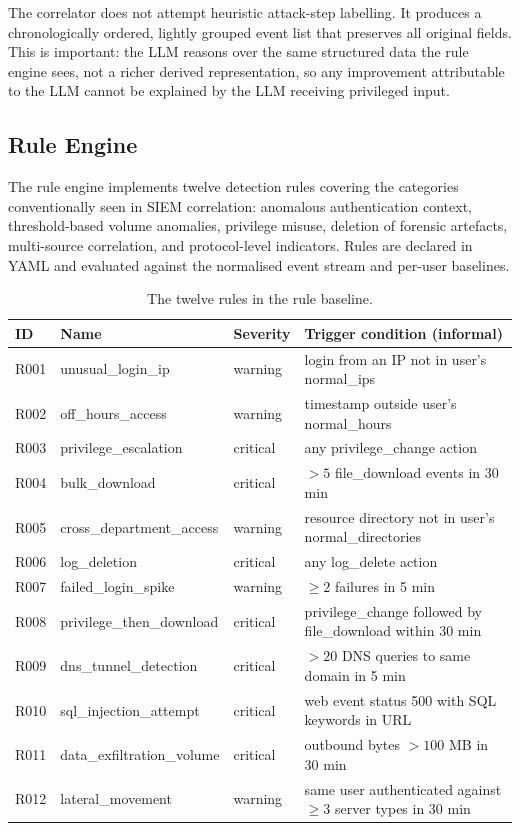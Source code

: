 \documentclass[conference]{IEEEtran}
\begin{document}
The correlator does not attempt heuristic attack-step labelling. It produces a chronologically ordered, lightly grouped event list that preserves all original fields. This is important: the LLM reasons over the same structured data the rule engine sees, not a richer derived representation, so any improvement attributable to the LLM cannot be explained by the LLM receiving privileged input.

\subsection{Rule Engine}
\label{sec:rules}

The rule engine implements twelve detection rules covering the categories conventionally seen in SIEM correlation: anomalous authentication context, threshold-based volume anomalies, privilege misuse, deletion of forensic artefacts, multi-source correlation, and protocol-level indicators. Rules are declared in YAML and evaluated against the normalised event stream and per-user baselines.

\begin{table}[ht]
\centering
\caption{The twelve rules in the rule baseline.}
\label{tab:rules}
\small
\begin{tabular}{L{0.06\columnwidth}L{0.30\columnwidth}L{0.14\columnwidth}L{0.40\columnwidth}}
\toprule
\textbf{ID} & \textbf{Name} & \textbf{Severity} & \textbf{Trigger condition (informal)} \\
\midrule
R001 & unusual\_login\_ip & warning  & login from an IP not in user's normal\_ips \\
R002 & off\_hours\_access & warning  & timestamp outside user's normal\_hours \\
R003 & privilege\_escalation & critical & any privilege\_change action \\
R004 & bulk\_download & critical & $>5$ file\_download events in 30 min \\
R005 & cross\_department\_access & warning & resource directory not in user's normal\_directories \\
R006 & log\_deletion & critical & any log\_delete action \\
R007 & failed\_login\_spike & warning & $\geq 2$ failures in 5 min \\
R008 & privilege\_then\_download & critical & privilege\_change followed by file\_download within 30 min \\
R009 & dns\_tunnel\_detection & critical & $>20$ DNS queries to same domain in 5 min \\
R010 & sql\_injection\_attempt & critical & web event status 500 with SQL keywords in URL \\
R011 & data\_exfiltration\_volume & critical & outbound bytes $>100$ MB in 30 min \\
R012 & lateral\_movement & warning  & same user authenticated against $\geq 3$ server types in 30 min \\
\bottomrule
\end{tabular}
\end{table}
\end{document}
